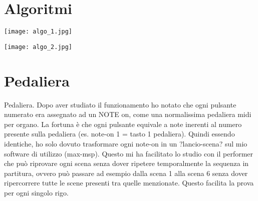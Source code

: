 \section{Algoritmi}
\begin{center}
\begin{minipage}[c]{1.\textwidth}
\texttt{[image: algo\_1.jpg]}
\end{minipage}
\end{center}
\begin{center}
\begin{minipage}[c]{1.\textwidth}
\texttt{[image: algo\_2.jpg]}
\end{minipage}
\end{center}


\section{Pedaliera}

Pedaliera. Dopo aver studiato il funzionamento ho notato che ogni pulsante numerato era assegnato ad un NOTE on, come una normalissima pedaliera midi per organo. La fortuna è che ogni pulsante equivale a note inerenti al numero presente sulla pedaliera (es. note-on 1 = tasto 1 pedaliera). Quindi essendo identiche, ho solo dovuto trasformare ogni note-on in un ?lancio-scena? sul mio software di utilizzo (max-msp). Questo mi ha facilitato lo studio con il performer che può riprovare ogni scena senza dover ripetere temporalmente la sequenza in partitura, ovvero può passare ad esempio dalla scena 1 alla scena 6 senza dover ripercorrere tutte le scene presenti tra quelle menzionate. Questo facilita la prova per ogni singolo rigo.
